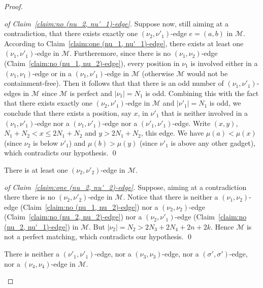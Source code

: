 \documentclass[a4paper,10pt]{llncs}
\begin{document}
\begin{proof}
\begin{proof}[of Claim~\ref{claim:no (nu_2, nu'_1)-edge}]
    Suppose now, still aiming at a contradiction, that there exists
    exactly one $(\nu_2, \nu'_1)$-edge $e = (a, b)$ in $\mathcal{M}$.
    According to Claim~\ref{claim:one (nu_1, nu'_1)-edge}, there exists at least
    one $(\nu_1, \nu'_1)$-edge in $\mathcal{M}$.
    Furtheremore, since
    there is no $(\nu_1, \nu_2)$-edge (Claim~\ref{claim:no (nu_1, nu_2)-edge}),
    every position in $\nu_1$ is involved either in a
    $(\nu_1, \nu_1)$-edge or in a $(\nu_1, \nu'_1)$-edge in $\mathcal{M}$
    (otherwise $\mathcal{M}$ would not be containment-free).
    Then it follows that that there is an odd number of $(\nu_1, \nu'_1)$-edges
    in $\mathcal{M}$ since $\mathcal{M}$ is perfect and $|\nu_1| = N_1$ is odd.
    Combining this with the fact that there exists exactly one $(\nu_2, \nu'_1)$-edge
    in $\mathcal{M}$ and $|\nu'_1| = N_1$ is odd,
    we conclude that there exists a position, say $x$, in $\nu'_1$
    that is neither involved in a $(\nu_1, \nu'_1)$-edge nor a $(\nu_1, \nu'_1)$-edge
    nor a $(\nu'_1, \nu'_1)$-edge.
    Write $(x, y)$, $N_1+N_2 < x \leq 2N_1 + N_2$ and $y > 2N_1 + N_2$, this edge.
    We have $\mu(a) < \mu(x)$ (since $\nu_2$ is below $\nu'_1$)
    and $\mu(b) > \mu(y)$ (since $\nu'_1$ is above any other gadget),
    which contradicts our hypothesis.
    \qed
  \end{proof}

  \begin{claim}
    \label{claim:one (nu_2, nu'_2)-edge}
    There is at least one $(\nu_2, \nu'_2)$-edge in $\mathcal{M}$.
  \end{claim}

  \begin{proof}[of Claim~\ref{claim:one (nu_2, nu'_2)-edge}]
    Suppose, aiming at a contradiction there there is no
    $(\nu_2, \nu'_2)$-edge in $\mathcal{M}$.
    Notice that there is neither
    a $(\nu_1, \nu_2)$-edge (Claim~\ref{claim:no (nu_1, nu_2)-edge})
    nor a $(\nu_2, \nu_2)$-edge (Claim~\ref{claim:no (nu_2, nu_2)-edge})
    nor a $(\nu_2, \nu'_1)$-edge (Claim~\ref{claim:no (nu_2, nu'_1)-edge})
    in $\mathcal{M}$.
    But $|\nu_2| = N_2 > 2N_3 + 2N_4 + 2n + 2k$.
    Hence $\mathcal{M}$ is not a perfect matching,
    which contradicts our hypothesis.
    \qed
  \end{proof}

  \begin{claim}
    \label{claim:no (nu'_1, nu'_1),(nu_3, nu_3),(sigma' ,sigma'),(nu_4, nu_4)-edge}
    There is
    neither a $(\nu'_1, \nu'_1)$-edge,
    nor a $(\nu_3, \nu_3)$-edge,
    nor a $(\sigma', \sigma')$-edge,
    nor a $(\nu_4, \nu_4)$-edge
    in $\mathcal{M}$.
  \end{claim}


\end{proof}
\end{document}
